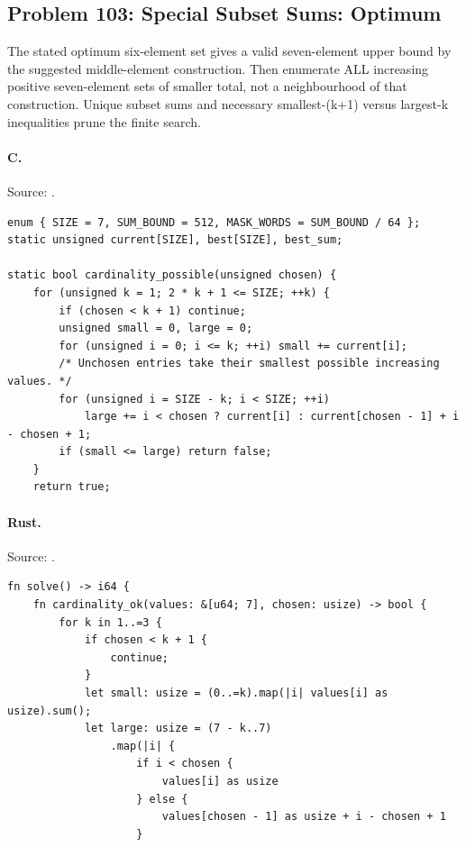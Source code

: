 \subsection{Problem 103: Special Subset Sums: Optimum}
\label{walkthrough:p103}
The stated optimum six-element set gives a valid seven-element upper bound by the suggested middle-element construction. Then enumerate ALL increasing positive seven-element sets of smaller total, not a neighbourhood of that construction. Unique subset sums and necessary smallest-(k+1) versus largest-k inequalities prune the finite search.

\paragraph{C.} Source: .
\begin{lstlisting}
enum { SIZE = 7, SUM_BOUND = 512, MASK_WORDS = SUM_BOUND / 64 };
static unsigned current[SIZE], best[SIZE], best_sum;

static bool cardinality_possible(unsigned chosen) {
    for (unsigned k = 1; 2 * k + 1 <= SIZE; ++k) {
        if (chosen < k + 1) continue;
        unsigned small = 0, large = 0;
        for (unsigned i = 0; i <= k; ++i) small += current[i];
        /* Unchosen entries take their smallest possible increasing values. */
        for (unsigned i = SIZE - k; i < SIZE; ++i)
            large += i < chosen ? current[i] : current[chosen - 1] + i - chosen + 1;
        if (small <= large) return false;
    }
    return true;
\end{lstlisting}

\paragraph{Rust.} Source: .
\begin{lstlisting}
fn solve() -> i64 {
    fn cardinality_ok(values: &[u64; 7], chosen: usize) -> bool {
        for k in 1..=3 {
            if chosen < k + 1 {
                continue;
            }
            let small: usize = (0..=k).map(|i| values[i] as usize).sum();
            let large: usize = (7 - k..7)
                .map(|i| {
                    if i < chosen {
                        values[i] as usize
                    } else {
                        values[chosen - 1] as usize + i - chosen + 1
                    }
\end{lstlisting}


